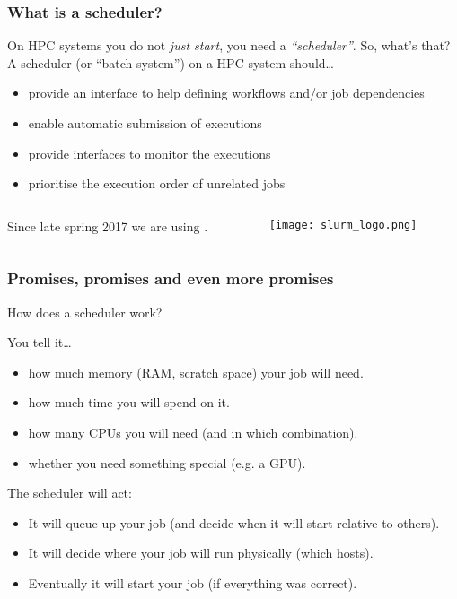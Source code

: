 \begin{frame}
  \frametitle{What is a scheduler?}
  On HPC systems you do not \emph{just start}, you need a \emph{``scheduler''}.
  So, what's that?\newline
  A scheduler (or ``batch system'') on a HPC system should\ldots
  \begin{itemize}
  \item provide an interface to help defining workflows and/or job dependencies
  \item enable automatic submission of executions
  \item provide interfaces to monitor the executions
  \item prioritise the execution order of unrelated jobs
  \end{itemize}
  \begin{columns}
    \begin{column}{0.8\linewidth}
      Since late spring 2017 we are using \slurm.
    \end{column}
    \begin{column}{0.2\linewidth}
      \begin{figure}
        \centering
        \texttt{[image: slurm\_logo.png]}
      \end{figure}
    \end{column}
  \end{columns}
  \vfill
\end{frame}

\begin{frame}
  \frametitle{Promises, promises and even more promises}
  How does a scheduler work?
  \pause
  \begin{block}{You tell it\ldots}
    \begin{itemize}
    \item how much memory (RAM, scratch space) your job will need.\pause
    \item how much time you will spend on it.\pause
    \item how many CPUs you will need (and in which combination).\pause
    \item whether you need something special (e.g. a GPU).
    \end{itemize}
  \end{block}
  \pause \vspace{-0.2cm}
  \begin{exampleblock}{The scheduler will act:}
    \begin{itemize}
    \item It will queue up your job (and decide when it will start relative to others).\pause
    \item It will decide where your job will run physically (which hosts).\pause
    \item Eventually it will start your job (if everything was correct).
    \end{itemize}
  \end{exampleblock}
  \vfill
\end{frame}

